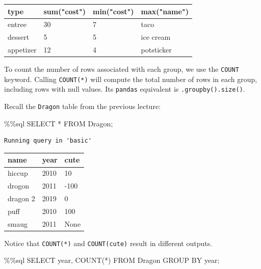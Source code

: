 \documentclass[
  letterpaper,
  DIV=11,
  numbers=noendperiod]{scrreprt}
\newenvironment{Shaded}{\begin{snugshade}}{\end{snugshade}}
\newcommand{\NormalTok}[1]{\textcolor[rgb]{0.00,0.23,0.31}{#1}}
\newcommand{\OperatorTok}[1]{\textcolor[rgb]{0.37,0.37,0.37}{#1}}
\begin{document}
\begin{longtable}[]{@{}llll@{}}
\toprule\noalign{}
type & sum("cost") & min("cost") & max("name") \\
\midrule\noalign{}
\endhead
\bottomrule\noalign{}
\endlastfoot
entree & 30 & 7 & taco \\
dessert & 5 & 5 & ice cream \\
appetizer & 12 & 4 & potsticker \\
\end{longtable}

To count the number of rows associated with each group, we use the
\texttt{COUNT} keyword. Calling \texttt{COUNT(*)} will compute the total
number of rows in each group, including rows with null values. Its
\texttt{pandas} equivalent is \texttt{.groupby().size()}.

Recall the \texttt{Dragon} table from the previous lecture:

\begin{Shaded}
\begin{Highlighting}[]
\OperatorTok{\%\%}\NormalTok{sql}
\NormalTok{SELECT }\OperatorTok{*}\NormalTok{ FROM Dragon}\OperatorTok{;}
\end{Highlighting}
\end{Shaded}

\begin{verbatim}
Running query in 'basic'
\end{verbatim}

\begin{longtable}[]{@{}lll@{}}
\toprule\noalign{}
name & year & cute \\
\midrule\noalign{}
\endhead
\bottomrule\noalign{}
\endlastfoot
hiccup & 2010 & 10 \\
drogon & 2011 & -100 \\
dragon 2 & 2019 & 0 \\
puff & 2010 & 100 \\
smaug & 2011 & None \\
\end{longtable}

Notice that \texttt{COUNT(*)} and \texttt{COUNT(cute)} result in
different outputs.

\begin{Shaded}
\begin{Highlighting}[]
\OperatorTok{\%\%}\NormalTok{sql}
\NormalTok{SELECT year, COUNT(}\OperatorTok{*}\NormalTok{)}
\NormalTok{FROM Dragon}
\NormalTok{GROUP BY year}\OperatorTok{;}
\end{Highlighting}
\end{Shaded}
\end{document}
